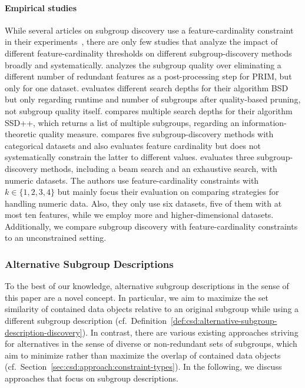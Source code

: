 \documentclass{article}
\theoremstyle{definition}
\begin{document}
\paragraph{Empirical studies}

While several articles on subgroup discovery use a feature-cardinality constraint in their experiments~\cite{arzamasov2022pedagogical, mampaey2012efficient, lavrac2006relevancy, leeuwen2012diverse, leeuwen2013discovering}, there are only few studies that analyze the impact of different feature-cardinality thresholds on different subgroup-discovery methods broadly and systematically.
\cite{friedman1999bump} analyzes the subgroup quality over eliminating a different number of redundant features as a post-processing step for PRIM, but only for one dataset.
\cite{lemmerich2010fast} evaluates different search depths for their algorithm BSD but only regarding runtime and number of subgroups after quality-based pruning, not subgroup quality itself.
\cite{proencca2022robust} compares multiple search depths for their algorithm SSD++, which returns a list of multiple subgroups, regarding an information-theoretic quality measure.
\cite{helal2016subgroup} compares five subgroup-discovery methods with categorical datasets and also evaluates feature cardinality but does not systematically constrain the latter to different values.
\cite{meeng2021real} evaluates three subgroup-discovery methods, including a beam search and an exhaustive search, with numeric datasets.
The authors use feature-cardinality constraints with~$k \in \{1, 2, 3, 4\}$ but mainly focus their evaluation on comparing strategies for handling numeric data.
Also, they only use six datasets, five of them with at most ten features, while we employ more and higher-dimensional datasets.
Additionally, we compare subgroup discovery with feature-cardinality constraints to an unconstrained setting.

\subsubsection{Alternative Subgroup Descriptions}
\label{sec:csd:related-work:subgroup-discovery:alternatives}

To the best of our knowledge, alternative subgroup descriptions in the sense of this paper are a novel concept.
In particular, we aim to maximize the set similarity of contained data objects relative to an original subgroup while using a different subgroup description (cf.~Definition~\ref{def:csd:alternative-subgroup-description-discovery}).
In contrast, there are various existing approaches striving for alternatives in the sense of diverse or non-redundant sets of subgroups, which aim to minimize rather than maximize the overlap of contained data objects~\cite{atzmueller2015subgroup} (cf.~Section~\ref{sec:csd:approach:constraint-types}).
In the following, we discuss approaches that focus on subgroup descriptions.
\end{document}
